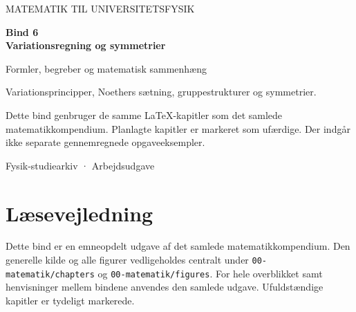\documentclass[11pt,a4paper,oneside]{book}
\begin{document}
\frontmatter
\begin{titlepage}
\centering
\vspace*{30mm}
{\sffamily\color{arkivblaa}\Large MATEMATIK TIL UNIVERSITETSFYSIK\par}
\vspace{16mm}
{\Huge\bfseries Bind 6\\[6mm]Variationsregning og symmetrier\par}
\vspace{13mm}
{\Large Formler, begreber og matematisk sammenhæng\par}
\vfill
\begin{minipage}{0.8\textwidth}
Variationsprincipper, Noethers sætning, gruppestrukturer og symmetrier.

Dette bind genbruger de samme LaTeX-kapitler som det samlede matematikkompendium. Planlagte kapitler er markeret som ufærdige. Der indgår ikke separate gennemregnede opgaveeksempler.
\end{minipage}
\vspace{14mm}
{\small Fysik-studiearkiv · Arbejdsudgave\par}
\end{titlepage}
\chapter*{Læsevejledning}
Dette bind er en emneopdelt udgave af det samlede matematikkompendium. Den generelle kilde og alle figurer vedligeholdes centralt under \texttt{00-matematik/chapters} og \texttt{00-matematik/figures}. For hele overblikket samt henvisninger mellem bindene anvendes den samlede udgave. Ufuldstændige kapitler er tydeligt markerede.
\begingroup\small\tableofcontents\endgroup
\mainmatter


\end{document}
